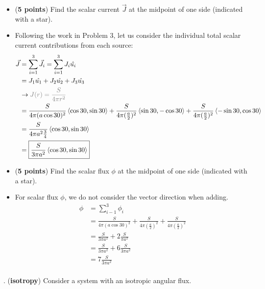 \documentclass[11pt]{article}
\newcommand{\ans}[1]{{\color{violet}#1}}
\begin{document}
\begin{itemize}
\item[(a)] ({\bf 5 points}) Find the scalar current $\vec{J}$ at the midpoint of one side (indicated with a star).
\item[] \ans{
    Following the work in Problem 3, let us consider the individual total scalar current contributions from each source:
    \begin{align*}
        \vec{J} &= \sum_{i=1}^{3}\vec{J_i} = \sum_{i=1}^{3}J_i\hat{u_i} \\
        &= J_1\hat{u_1} + J_2\hat{u_2} + J_3\hat{u_3} \\
        &\rightarrow\color{gray}J(r)=\frac{S}{4\pi r^2} \\
        &= \frac{S}{4\pi (a\cos{30})^2}\expval{\cos{30},\sin{30}} + \frac{S}{4\pi (\frac{a}{2})^2}\expval{\sin{30},-\cos{30}} + \frac{S}{4\pi (\frac{a}{2})^2}\expval{-\sin{30},\cos{30}} \\
        &= \frac{S}{4\pi a^2\frac{3}{4}}\expval{\cos{30},\sin{30}} \\
        &= \boxed{\frac{S}{3\pi a^2}\expval{\cos{30},\sin{30}} }
    \end{align*}
}
\item[(b)] ({\bf 5 points}) Find the scalar flux $\phi$ at the midpoint of one side (indicated with a star).
\item[] \ans{
    For scalar flux $\phi$, we do not consider the vector direction when adding.
    \begin{align*}
        \phi &= \sum_{i-1}^{3}\phi_i\\
        &= \frac{S}{4\pi (a\cos{30})^2} + \frac{S}{4\pi (\frac{a}{2})^2} + \frac{S}{4\pi (\frac{a}{2})^2} \\
        &= \frac{S}{3\pi a^2} +2\frac{S}{\pi a^2} \\
        &= \frac{S}{3\pi a^2} +6\frac{S}{3\pi a^2} \\
        &= \boxed{7\frac{S}{3\pi a^2}} \\
    \end{align*}
}
\end{itemize}

\clearpage
{}. ({\bf isotropy}) Consider a system with an isotropic angular flux.
\end{document}
